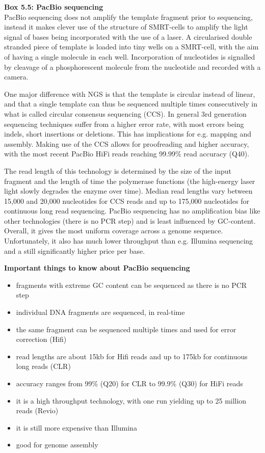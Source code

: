 \begin{framed}
\textbf{Box 5.5: PacBio sequencing}\\
PacBio sequencing does not amplify the template fragment prior to sequencing,
instead it makes clever use of the structure of SMRT-cells to amplify the
light signal of bases being incorporated with the use of a laser.
A circularised double stranded piece
of template is loaded into tiny wells on a SMRT-cell, with the aim of having
a single molecule in each well. Incorporation of nucleotides is signalled
by cleavage of a phosphorescent molecule from the nucleotide and recorded
with a camera.

One major difference with NGS is that the template is circular instead of
linear, and that a single template can thus be sequenced multiple times
consecutively in what is called circular consensus sequencing (CCS). In
general 3rd generation sequencing techniques suffer from a higher error
rate, with most errors being indels, short insertions or deletions. This
has implications for e.g. mapping and assembly. Making use of the CCS
allows for proofreading and higher accuracy, with the most
recent PacBio HiFi reads reaching 99.99\% read accuracy (Q40).

The read length of this technology is determined by the size of the input
fragment and the length of time the polymerase functions (the high-energy
laser light slowly degrades the enzyme over time). Median read lengths vary
between 15,000 and 20,000 nucleotides for CCS reads and up to 175,000
nucleotides for continuous long read sequencing. PacBio sequencing has no
amplification bias like other technologies (there is no PCR step) and is
least influenced by GC-content. Overall, it gives the most uniform coverage
across a genome sequence. Unfortunately, it also has much lower throughput
than e.g. Illumina sequencing and a still significantly higher price per
base.
\end{framed}

\begin{framed}
\textbf{Important things to know about PacBio sequencing}\\
\begin{itemize}
\item fragments with extreme GC content can be sequenced as there is no PCR step
\item individual DNA fragments are sequenced, in real-time
\item the same fragment can be sequenced multiple times and used for error correction (Hifi)
\item read lengths are about 15kb for Hifi reads and up to 175kb for continuous long reads (CLR)
\item accuracy ranges from 99\% (Q20) for CLR to 99.9\% (Q30) for HiFi reads
\item it is a high throughput technology, with one run yielding up to 25 million reads (Revio)
\item it is still more expensive than Illumina
\item good for genome assembly
\end{itemize}
\end{framed}


